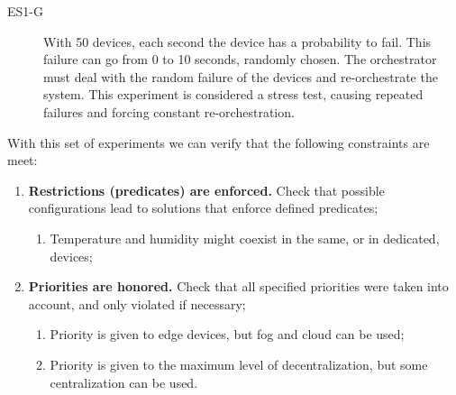 \begin{description}
    \item[ES1-G] With 50 devices, each second the device has a probability to fail. This failure can go from 0 to 10 seconds, randomly chosen. The orchestrator must deal with the random failure of the devices and re-orchestrate the system. This experiment is considered a stress test, causing repeated failures and forcing constant re-orchestration.
\end{description}

With this set of experiments we can verify that the following constraints are meet:
\begin{enumerate}
    \item \textbf{Restrictions (predicates) are enforced.} Check that possible configurations lead to solutions that enforce defined predicates;
        \begin{enumerate}
            \item Temperature and humidity might coexist in the same, or in dedicated, devices;
        \end{enumerate}
    \item \textbf{Priorities are honored.} Check that all specified priorities were taken into account, and only violated if necessary;
        \begin{enumerate}
            \item Priority is given to edge devices, but fog and cloud can be used;
            \item Priority is given to the maximum level of decentralization, but some centralization can be used.
        \end{enumerate}
\end{enumerate}


